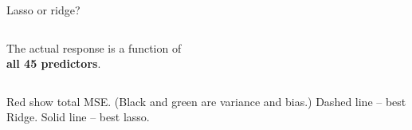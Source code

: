 \documentclass[mathserif, aspectratio=169]{beamer}
\begin{document}
\begin{frame}{Lasso or ridge?}
\begin{columns}
\begin{center}
The actual response is a function of\\ \textbf{all 45 predictors}.  
\end{center}  


\end{columns}

\vspace{5mm}
\footnotesize Red show total MSE.  (Black and green are variance and bias.) 
Dashed line -- best Ridge.  Solid line -- best lasso.  
\end{frame}
\end{document}
